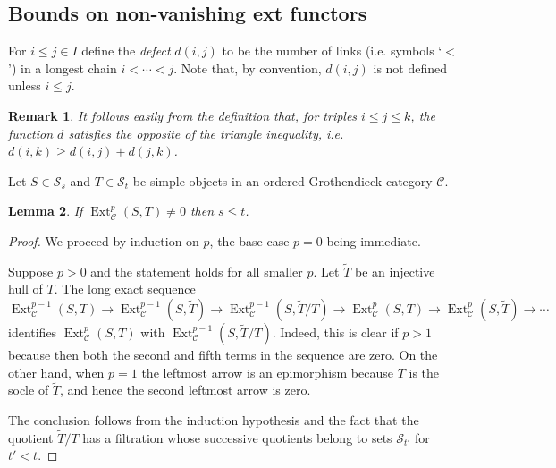 \documentclass[11pt]{article}
\theoremstyle{plain}
\newtheorem{lemma}{Lemma}[section]
\theoremstyle{nonumberplain}
\theoremstyle{plain}
\newtheorem{remark}[lemma]{Remark}
\theoremstyle{nonumberplain}
\newtheorem{proof}{Proof}
\newcommand\cC{{\mathcal C}}
\newcommand\cS{{\mathcal S}}
\DeclareMathOperator{\Ext}{\mathrm{Ext}}
\newcommand{\define}[1]{{\em #1}}
\begin{document}
\subsection{Bounds on non-vanishing ext functors}
\label{subse.ext}


For $i\le j\in I$ define the \define{defect} $d(i,j)$ to be the number of links (i.e. symbols `$<$') in a longest chain $i<\cdots<j$. Note that, by convention, $d(i,j)$ is not defined unless $i\le j$.  


\begin{remark}
  It follows easily from the definition that, for triples $i\le j\le k$, the function $d$ satisfies the opposite of the triangle inequality, i.e. $d(i,k)\ge d(i,j)+d(j,k)$.  
\end{remark}


Let $S\in \cS_s$ and $T\in \cS_t$ be simple objects in an ordered Grothendieck category $\cC$.


\begin{lemma}\label{le.ext_1st_approx}
If $\Ext_\cC^p(S,T)\ne 0$ then $s\le t$. 
\end{lemma}
\begin{proof}
We proceed by induction on $p$, the base case $p=0$ being immediate. 

Suppose $p>0$ and the statement holds for all smaller $p$.  Let $\widetilde{T}$ be an injective hull of $T$. The long exact sequence
\begin{equation*}
\Ext_\cC^{p-1}(S,T)\to \Ext_\cC^{p-1}(S,\widetilde{T})\to \Ext_\cC^{p-1}(S,\widetilde{T}/T)\to \Ext_\cC^p(S,T)\to \Ext_\cC^p(S,\widetilde T)\to\cdots\end{equation*}
identifies $\Ext_\cC^p(S,T)$ with $\Ext_\cC^{p-1}(S,\widetilde{T}/T)$. Indeed, this is clear if $p>1$ because then both the second and fifth terms in the sequence are zero. On the other hand, when $p=1$  the leftmost arrow is an epimorphism because $T$ is the socle of $\widetilde{T}$, and hence the second leftmost arrow is zero. 

The conclusion follows from the induction hypothesis and the fact that the quotient $\widetilde{T}/T$ has a filtration whose successive quotients belong to sets $\cS_{t'}$ for $t'<t$. 
\end{proof}
\end{document}
